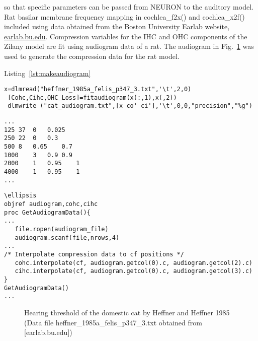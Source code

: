  so that
specific parameters can be passed from NEURON to the auditory model.  Rat
basilar membrane frequency mapping in \mbox{\textsf{cochlea\_f2x()}} and
\mbox{\textsf{cochlea\_x2f()}} included using data obtained from the Boston
University Earlab website, \url{earlab.bu.edu}.  Compression variables for the
IHC and OHC components of the Zilany model are fit using audiogram data of a
rat.  The audiogram in Fig.~\ref{fig:AudThresholdRat} was used to generate the
compression data for the rat model.

\medskip{}

Listing~\ref{lst:makeaudiogram}
\begin{lstlisting}[label=lst:makeaudiogram,caption=Using  \mbox{\textsf{fitaudiogram.m}} to create COHC and CIHC vectors for the cat.]
 x=dlmread("heffner_1985a_felis_p347_3.txt",'\t',2,0)
 [Cohc,Cihc,OHC_Loss]=fitaudiogram(x(:,1),x(,2))
 dlmwrite ("cat_audiogram.txt",[x co' ci'],'\t',0,0,"precision","%g")
\end{lstlisting}


\begin{lstlisting}[label=lst:cataudiogram,caption=Portion of \mbox{\textsf{cat\_audiogram\.txt}}]
...
125	37	0	0.025
250	22	0	0.3
500	8	0.65	0.7
1000	3	0.9	0.9
2000	1	0.95	1
4000	1	0.95	1
...
\end{lstlisting}


\begin{lstlisting}[label=lst:getaudiogramdata,caption= Procedure to get
  audiogram data and interpolate to freuencies in \textsf{cf} vector (
  \mbox{\textsf{Utilities.hoc}})]
\ellipsis
objref audiogram,cohc,cihc
proc GetAudiogramData(){
...
   file.ropen(audiogram_file)
   audiogram.scanf(file,nrows,4)
...
/* Interpolate compression data to cf positions */
   cohc.interpolate(cf, audiogram.getcol(0).c, audiogram.getcol(2).c)
   cihc.interpolate(cf, audiogram.getcol(0).c, audiogram.getcol(3).c)
}
GetAudiogramData() 
...
\end{lstlisting}

\medskip{}

\begin{figure}[htb]
\begin{center}
\caption{Hearing threshold of the domestic cat by Heffner and Heffner
  1985 \citep{HeffnerHeffner:1985} (Data file
  \mbox{heffner\_1985a\_felis\_p347\_3.txt} obtained from [earlab.bu.edu])}
\label{fig:AudThresholdRat}
\end{center}
\end{figure}


